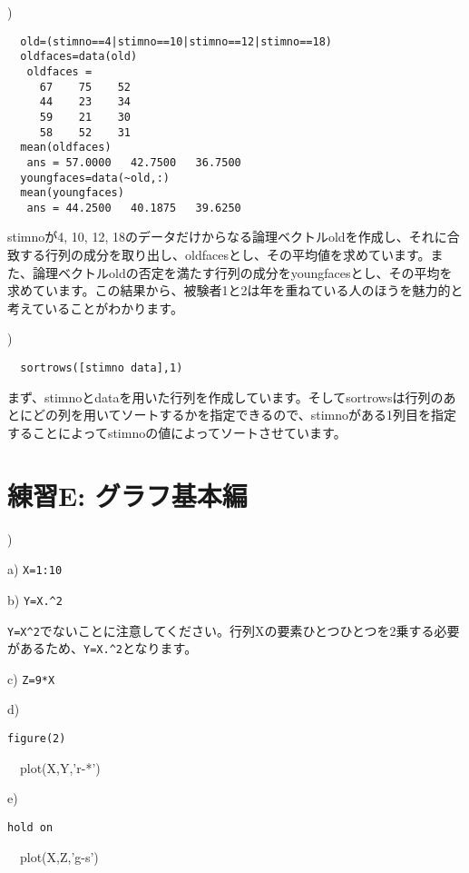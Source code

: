 \documentclass{jsarticle}
\begin{document}
\bigskip

)

\begin{verbatim}
  old=(stimno==4|stimno==10|stimno==12|stimno==18)
  oldfaces=data(old)
   oldfaces =
     67    75    52
     44    23    34
     59    21    30
     58    52    31
  mean(oldfaces)
   ans = 57.0000   42.7500   36.7500
  youngfaces=data(~old,:)
  mean(youngfaces)
   ans = 44.2500   40.1875   39.6250
\end{verbatim}

\begin{screen}
stimnoが4, 10, 12, 18のデータだけからなる論理ベクトルoldを作成し、それに合致する行列の成分を取り出し、oldfacesとし、その平均値を求めています。また、論理ベクトルoldの否定を満たす行列の成分をyoungfacesとし、その平均を求めています。この結果から、被験者1と2は年を重ねている人のほうを魅力的と考えていることがわかります。
\end{screen}

\bigskip

)

\begin{verbatim}
  sortrows([stimno data],1)
\end{verbatim}

\begin{screen}
まず、stimnoとdataを用いた行列を作成しています。そしてsortrowsは行列のあとにどの列を用いてソートするかを指定できるので、stimnoがある1列目を指定することによってstimnoの値によってソートさせています。
\end{screen}

\bigskip

\section{練習E: グラフ基本編}

)

a) {\tt X=1:10}

b) {\tt Y=X.\verb|^|2}

\begin{screen}
{\tt Y=X\verb|^|2}でないことに注意してください。行列Xの要素ひとつひとつを2乗する必要があるため、{\tt Y=X.\verb|^|2}となります。
\end{screen}

c) {\tt Z=9*X}

d) {\tt figure(2)

\ \ plot(X,Y,'r-*')}

e) {\tt hold on

\ \ plot(X,Z,'g-s')}
\end{document}
